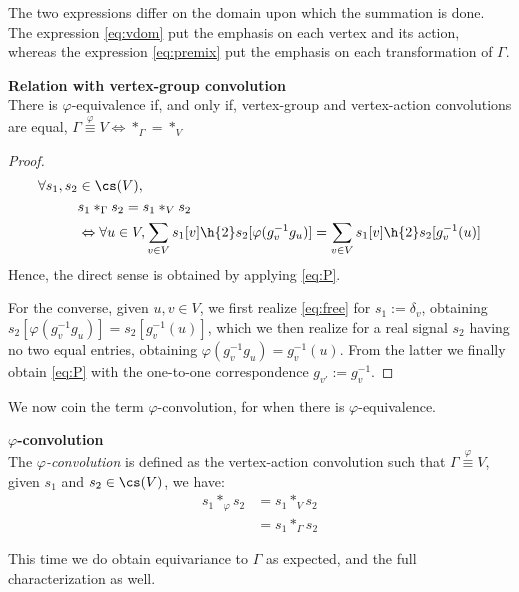 The two expressions differ on the domain upon which the summation is done. The expression \eqref{eq:vdom} put the emphasis on each vertex and its action, whereas the expression \eqref{eq:premix} put the emphasis on each transformation of $\Gamma$.

\begin{lemma}\textbf{Relation with vertex-group convolution}\\
There is $\varphi$-equivalence if, and only if, vertex-group and vertex-action convolutions are equal, \ie
$\Gamma \overset{\varphi}{\equiv} V \Leftrightarrow \ast_{\Gamma} = \ast_{V}$
\label{lem:rel23}
\end{lemma}
\begin{proof}
\begin{align}
\forall s_1, s_2 & \in \cs(V),\nonumber\\
& s_1 \ast_{\Gamma} s_2 = s_1 \ast_{V} s_2 \nonumber\\
& \Leftrightarrow \forall u \in V,
\displaystyle \sum_{v \in V} s_1[v] \h{2} s_2[\varphi(g_v^{-1}g_u)] = \displaystyle \sum_{v \in V} s_1[v] \h{2} s_2[g_v^{-1}(u)] \label{eq:free}
\end{align}
Hence, the direct sense is obtained by applying \eqref{eq:P}.

For the converse, given $u, v \in V$, we first realize \eqref{eq:free} for $s_1 := \delta_v$, obtaining $s_2[\varphi(g_v^{-1}g_u)] = s_2[g_v^{-1}(u)]$, which we then realize for a real signal $s_2$ having no two equal entries, obtaining $\varphi(g_v^{-1}g_u) = g_v^{-1}(u)$. From the latter we finally obtain \eqref{eq:P} with the one-to-one correspondence $g_{v'} := g_v^{-1}$.
\end{proof}

We now coin the term $\varphi$-convolution, for when there is $\varphi$-equivalence.

\begin{definition}\textbf{$\varphi$-convolution}\\
The \emph{$\varphi$-convolution} is defined as the vertex-action convolution such that $\Gamma \overset{\varphi}{\equiv} V$, \ie given $s_1$ and $s_2 \in \cs(V)$, we have:
\begin{align*}
s_1 \ast_{\varphi} s_2 &= s_1 \ast_{V} s_2\\
&= s_1 \ast_{\Gamma} s_2
\end{align*}
\label{def:convv}
\end{definition}

This time we do obtain equivariance to $\Gamma$ as expected, and the full characterization as well.

